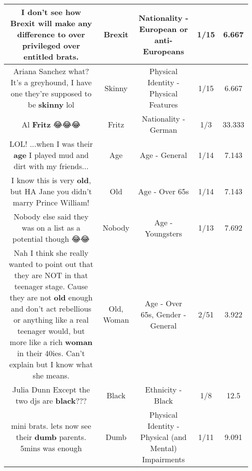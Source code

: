 \documentclass[11pt]{article}
\newlength\mylength
\begin{document}
\begin{center}
\begin{longtable}{|C{.65\mylength}|C{.30\mylength}|C{.12\mylength}|C{.12\mylength}|C{.12\mylength}|}
  \small I don't see how \textbf{Brexit} will make any difference to over privileged over entitled brats.\normalsize   & Brexit & Nationality - European or anti-Europeans & 1/15 & 6.667 \\  \hline
  \small Ariana Sanchez what? It's a greyhound, I have one they're supposed to be \textbf{skinny} lol\normalsize   & Skinny & Physical Identity - Physical Features & 1/15 & 6.667 \\  \hline
  \small Al \textbf{Fritz} 😂😂😂\normalsize   & Fritz & Nationality - German & 1/3 & 33.333 \\  \hline
  \small LOL! ...when I was their \textbf{age} I played mud and dirt with my friends...\normalsize   & Age & Age - General & 1/14 & 7.143 \\  \hline
  \small I know this is very \textbf{old}, but HA Jane you didn't marry Prince William!\normalsize   & Old & Age - Over 65s & 1/14 & 7.143 \\  \hline
  \small Nobody else said they was on a list as a potential though 😂😂\normalsize   & Nobody & Age - Youngsters & 1/13 & 7.692 \\  \hline
  \small Nah I think she really wanted to point out that they are NOT in that teenager stage. Cause they are not \textbf{old} enough and don't act rebellious or anything like a real teenager would, but more like a rich \textbf{woman} in their 40ies. Can't explain but I know what she means.\normalsize   & Old, Woman & Age - Over 65s, Gender - General & 2/51 & 3.922 \\  \hline
  \small Julia Dunn Except the two djs are \textbf{black}???\normalsize   & Black & Ethnicity - Black & 1/8 & 12.5 \\  \hline
  \small mini brats. lets now see their \textbf{dumb} parents. 5mins was enough\normalsize   & Dumb & Physical Identity - Physical (and Mental) Impairments & 1/11 & 9.091 \\  \hline

\end{longtable}
\end{center}
\end{document}
